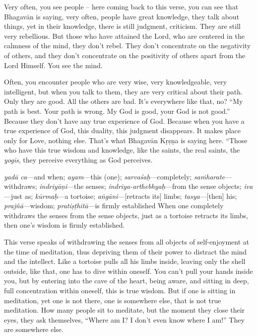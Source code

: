 Very often, you see people – here coming back to this verse, you can see that Bhagavān is saying, very often, people have great knowledge, they talk about things, yet in their knowledge, there is still judgment, criticism. They are still very rebellious. But those who have attained the Lord, who are centered in the calmness of the mind, they don’t rebel. They don’t concentrate on the negativity of others, and they don’t concentrate on the positivity of others apart from the Lord Himself. You see the mind.

Often, you encounter people who are very wise, very knowledgeable, very intelligent, but when you talk to them, they are very critical about their path. Only they are good. All the others are bad. It’s everywhere like that, no? “My path is best. Your path is wrong. My God is good, your God is not good.” Because they don’t have any true experience of God. Because when you have a true experience of God, this duality, this judgment disappears. It makes place only for Love, nothing else. That’s what Bhagavān Kṛṣṇa is saying here. “Those who have this true wisdom and knowledge, like the saints, the real saints, the \textit{yogīs}, they perceive everything as God perceives.

{%
  \textit{yadā ca}---and when; 
  \textit{ayam}---this (one); 
  \textit{sarvaśaḥ}---completely; 
  \textit{saṁharate}---withdraws; 
  \textit{indriyāṇi}---the senses; 
  \textit{indriya-arthebhyaḥ}---from the sense objects; 
  \textit{iva}---just as; 
  \textit{kūrmaḥ}---a tortoise; 
  \textit{aṅgāni}---[retracts its] limbs; 
  \textit{tasya}---[then] his; 
  \textit{prajñā}---wisdom; 
  \textit{pratiṣṭhitā}---is firmly established
}
{%
  When one completely withdraws the senses from the sense objects, just as a tortoise retracts its limbs, then one's wisdom is firmly established.
}

This verse speaks of withdrawing the senses from all objects of self-enjoyment at the time of meditation, thus depriving them of their power to distract the mind and the intellect. Like a tortoise pulls all his limbs inside, leaving only the shell outside, like that, one has to dive within oneself. You can’t pull your hands inside you, but by entering into the cave of the heart, being aware, and sitting in deep, full concentration within oneself, this is true wisdom. But if one is sitting in meditation, yet one is not there, one is somewhere else, that is not true meditation. How many people sit to meditate, but the moment they close their eyes, they ask themselves, “Where am I? I don’t even know where I am!” They are somewhere else.

